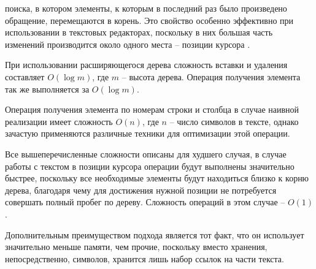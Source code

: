 \documentclass{fefu}
\begin{document}
				поиска, в котором элементы, к которым в последний раз было произведено
				обращение, перемещаются в корень. Это свойство особенно эффективно при
				использовании в текстовых редакторах, поскольку в них большая часть изменений
				производится около одного места -- позиции курсора \cite{SplayTreeArticle}.
				\par При использовании расширяющегося дерева сложность вставки и удаления
				составляет $O(\log{m})$, где $m$ -- высота дерева. Операция получения
				элемента так же выполняется за $O(\log{m})$.
				\par Операция получения элемента по номерам строки и столбца в случае наивной
				реализации имеет сложность $O(n)$, где $n$ -- число символов в тексте, однако
				зачастую применяются различные техники для оптимизации этой операции.
				\par Все вышеперечисленные сложности описаны для худшего случая, в случае
				работы с текстом в позиции курсора операции будут выполнены значительно 
				быстрее, поскольку все необходимые элементы будут находиться близко к корню
				дерева, благодаря чему для достижения нужной позиции не потребуется совершать
				полный пробег по дереву. Сложность операций в этом случае -- $O(1)$.
				\par Дополнительным преимуществом подхода является тот факт, что он
				использует значительно меньше памяти, чем прочие, поскольку вместо хранения,
				непосредственно, символов, хранится лишь набор ссылок на части текста.
\end{document}

